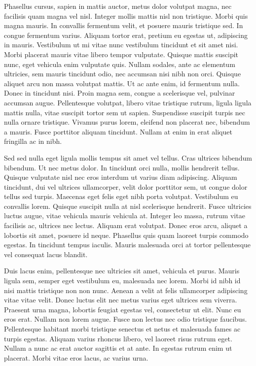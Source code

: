 Phasellus cursus, sapien in mattis auctor, metus dolor volutpat magna, nec facilisis quam magna vel nisl.
Integer mollis mattis nisl non tristique.
Morbi quis magna mauris.
In convallis fermentum velit, et posuere mauris tristique sed.
In congue fermentum varius.
Aliquam tortor erat, pretium eu egestas ut, adipiscing in mauris.
Vestibulum ut mi vitae nunc vestibulum tincidunt et sit amet nisi.
Morbi placerat mauris vitae libero tempor vulputate.
Quisque mattis suscipit nunc, eget vehicula enim vulputate quis.
Nullam sodales, ante ac elementum ultricies, sem mauris tincidunt odio, nec accumsan nisi nibh non orci.
Quisque aliquet arcu non massa volutpat mattis.
Ut ac ante enim, id fermentum nulla.
Donec in tincidunt nisi.
Proin magna sem, congue a scelerisque vel, pulvinar accumsan augue.
Pellentesque volutpat, libero vitae tristique rutrum, ligula ligula mattis nulla, vitae suscipit tortor sem ut sapien.
Suspendisse suscipit turpis nec nulla ornare tristique.
Vivamus purus lorem, eleifend non placerat nec, bibendum a mauris.
Fusce porttitor aliquam tincidunt.
Nullam at enim in erat aliquet fringilla ac in nibh.

Sed sed nulla eget ligula mollis tempus sit amet vel tellus.
Cras ultrices bibendum bibendum.
Ut nec metus dolor.
In tincidunt orci nulla, mollis hendrerit tellus.
Quisque vulputate nisl nec eros interdum ut varius diam adipiscing.
Aliquam tincidunt, dui vel ultrices ullamcorper, velit dolor porttitor sem, ut congue dolor tellus sed turpis.
Maecenas eget felis eget nibh porta volutpat.
Vestibulum eu convallis lorem.
Quisque suscipit nulla at nisl scelerisque hendrerit.
Fusce ultricies luctus augue, vitae vehicula mauris vehicula at.
Integer leo massa, rutrum vitae facilisis ac, ultrices nec lectus.
Aliquam erat volutpat.
Donec eros arcu, aliquet a lobortis sit amet, posuere id neque.
Phasellus quis quam laoreet turpis commodo egestas.
In tincidunt tempus iaculis.
Mauris malesuada orci at tortor pellentesque vel consequat lacus blandit.

Duis lacus enim, pellentesque nec ultricies sit amet, vehicula et purus.
Mauris ligula sem, semper eget vestibulum eu, malesuada nec lorem.
Morbi id nibh id nisi mattis tristique non non nunc.
Aenean a velit at felis ullamcorper adipiscing vitae vitae velit.
Donec luctus elit nec metus varius eget ultrices sem viverra.
Praesent urna magna, lobortis feugiat egestas vel, consectetur ut elit.
Nunc eu eros erat.
Nullam non lorem augue.
Fusce non lectus nec odio tristique faucibus.
Pellentesque habitant morbi tristique senectus et netus et malesuada fames ac turpis egestas.
Aliquam varius rhoncus libero, vel laoreet risus rutrum eget.
Nullam a nunc ac erat auctor sagittis et at ante.
In egestas rutrum enim ut placerat.
Morbi vitae eros lacus, ac varius urna.

